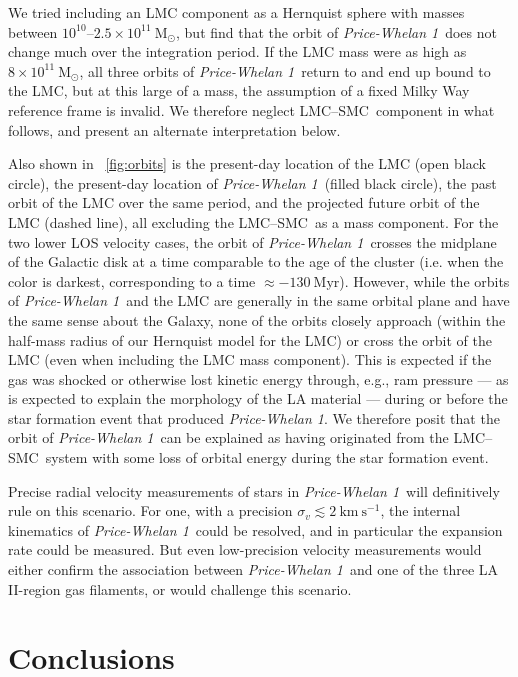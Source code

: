 \documentclass[twocolumn]{aastex62}
\newcommand{\msun}{\textrm{M}_\odot}
\newcommand{\kms}{\ensuremath{\textrm{km}~\textrm{s}^{-1}}}
\newcommand{\clustername}{\textsl{Price-Whelan 1}}
\newcommand{\lmcsmc}{LMC--SMC}
\begin{document}
We tried including an LMC component as a Hernquist sphere \citep{Hernquist:1990} with masses between $10^{10}$--$2.5\times 10^{11}~\msun$, but find that the orbit of \clustername\ does not change much over the integration period.
If the LMC mass were as high as $8\times 10^{11}~\msun$, all three orbits of \clustername\ return to and end up bound to the LMC, but at this large of a mass, the assumption of a fixed Milky Way reference frame is invalid.
We therefore neglect \lmcsmc\ component in what follows, and present an alternate interpretation below.

Also shown in \figurename~\ref{fig:orbits} is the present-day location of the LMC (open black circle), the present-day location of \clustername\ (filled black circle), the past orbit of the LMC over the same period, and the projected future orbit of the LMC (dashed line), all excluding the \lmcsmc\ as a mass component.
For the two lower LOS velocity cases, the orbit of \clustername\ crosses the midplane of the Galactic disk at a time comparable to the age of the cluster (i.e. when the color is darkest, corresponding to a time $\approx -130~\textrm{Myr}$).
However, while the orbits of \clustername\ and the LMC are generally in the same orbital plane and have the same sense about the Galaxy, none of the orbits closely approach (within the half-mass radius of our Hernquist model for the LMC) or cross the orbit of the LMC (even when including the LMC mass component).
This is expected if the gas was shocked or otherwise lost kinetic energy through, e.g., ram pressure --- as is expected to explain the morphology of the LA material \citep[e.g.,][]{Hammer:2015} --- during or before the star formation event that produced \clustername.
We therefore posit that the orbit of \clustername\ can be explained as having originated from the \lmcsmc\ system with some loss of orbital energy during the star formation event.

Precise radial velocity measurements of stars in \clustername\ will definitively rule on this scenario.
For one, with a precision $\sigma_v \lesssim 2~\kms$, the internal kinematics of \clustername\ could be resolved, and in particular the expansion rate could be measured.
But even low-precision velocity measurements would either confirm the association between \clustername\ and one of the three LA II-region gas filaments, or would challenge this scenario.


\section{Conclusions} \label{sec:conclusion}
\end{document}
